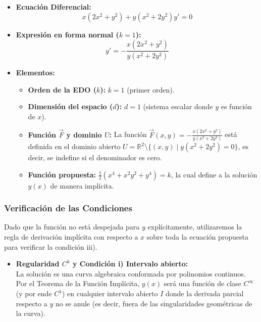 \begin{enumerate}[label=\arabic*., leftmargin=*]
    \begin{itemize}[leftmargin=*]
        \item \textbf{Ecuación Diferencial:}
        \[ x(2x^2+y^2) + y(x^2+2y^2)y' = 0 \]
        
        \item \textbf{Expresión en forma normal ($k = 1$):}
        \[ y' = -\frac{x(2x^2+y^2)}{y(x^2+2y^2)} \]
        
        \item \textbf{Elementos:}
        \begin{itemize}[leftmargin=*]
            \item \textbf{Orden de la EDO ($k$):} $k = 1$ (primer orden).
            \item \textbf{Dimensión del espacio ($d$):} $d = 1$ (sistema escalar donde $y$ es función de $x$).
            \item \textbf{Función $\vec{F}$ y dominio $U$:} La función $\vec{F}(x, y) = -\frac{x(2x^2+y^2)}{y(x^2+2y^2)}$ está definida en el dominio abierto $U = \mathbb{R}^2 \setminus \{(x,y) \mid y(x^2+2y^2) = 0\}$, es decir, se indefine si el denominador es cero.
            \item \textbf{Función propuesta:} $\frac{1}{2}(x^4 + x^2y^2 + y^4) = k$, la cual define a la solución $y(x)$ de manera implícita.
        \end{itemize}
    \end{itemize}

    \subsubsection*{Verificación de las Condiciones}

    Dado que la función no está despejada para $y$ explícitamente, utilizaremos la regla de derivación implícita con respecto a $x$ sobre toda la ecuación propuesta para verificar la condición iii).

    \begin{itemize}[leftmargin=*]
        \item \textbf{Regularidad $C^k$ y Condición i) Intervalo abierto:}\\
        La solución es una curva algebraica conformada por polinomios continuos. Por el Teorema de la Función Implícita, $y(x)$ será una función de clase $C^\infty$ (y por ende $C^1$) en cualquier intervalo abierto $I$ donde la derivada parcial respecto a $y$ no se anule (es decir, fuera de las singularidades geométricas de la curva).


\end{itemize}
\end{enumerate}
